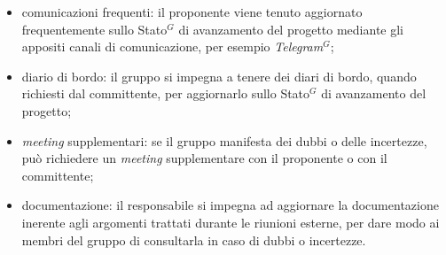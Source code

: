 \begin{itemize}
\begin{itemize}
		      \item comunicazioni frequenti: il proponente viene tenuto
		            aggiornato frequentemente sullo \gls{Stato}$^G$ di avanzamento del
		            progetto mediante gli appositi canali di comunicazione, per
		            esempio \textit{\gls{Telegram}$^G$};

		      \item diario di bordo: il gruppo si impegna a tenere dei diari di
		            bordo, quando richiesti dal committente, per aggiornarlo
		            sullo \gls{Stato}$^G$ di avanzamento del progetto;

		      \item \textit{meeting} supplementari: se il gruppo manifesta dei
		            dubbi o delle incertezze, può richiedere un \textit{meeting}
		            supplementare con il proponente o con il committente;

		      \item documentazione: il responsabile si impegna ad aggiornare
		            la documentazione inerente agli argomenti trattati durante
		            le riunioni esterne, per dare modo ai membri del gruppo di
		            consultarla in caso di dubbi o incertezze.
	      \end{itemize}
\end{itemize}
